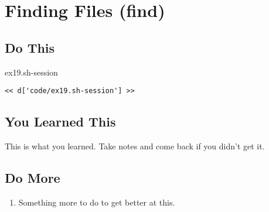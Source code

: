\chapter{Finding Files (find)}

\section{Do This}

\begin{code}{ex19.sh-session}
\begin{Verbatim}
<< d['code/ex19.sh-session'] >>
\end{Verbatim}
\end{code}


\section{You Learned This}

This is what you learned.  Take notes and come back if you didn't get it.

\section{Do More}

\begin{enumerate}
\item Something more to do to get better at this.
\end{enumerate}

